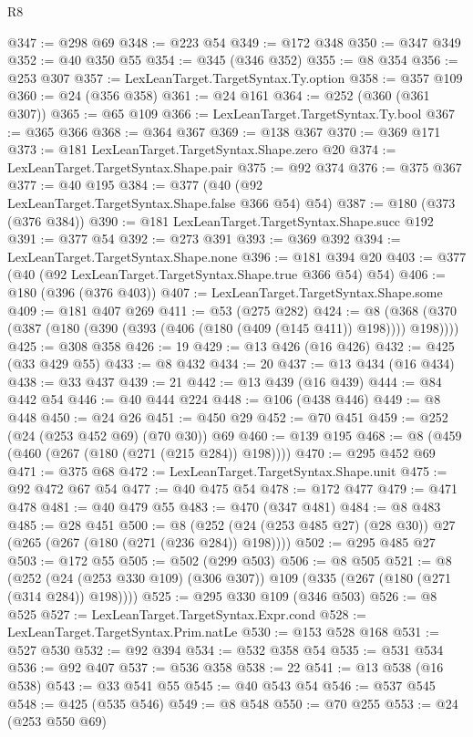 \begin{lexlean}{R8}
\begin{coremodule}
@347 := @298 @69
@348 := @223 @54
@349 := @172 @348
@350 := @347 @349
@352 := @40 @350 @55
@354 := @345 (@346 @352)
@355 := @8 @354
@356 := @253 @307
@357 := LexLeanTarget.TargetSyntax.Ty.option
@358 := @357 @109
@360 := @24 (@356 @358)
@361 := @24 @161
@364 := @252 (@360 (@361 @307))
@365 := @65 @109
@366 := LexLeanTarget.TargetSyntax.Ty.bool
@367 := @365 @366
@368 := @364 @367
@369 := @138 @367
@370 := @369 @171
@373 := @181 LexLeanTarget.TargetSyntax.Shape.zero @20
@374 := LexLeanTarget.TargetSyntax.Shape.pair
@375 := @92 @374
@376 := @375 @367
@377 := @40 @195
@384 := @377 (@40 (@92 LexLeanTarget.TargetSyntax.Shape.false @366 @54) @54)
@387 := @180 (@373 (@376 @384))
@390 := @181 LexLeanTarget.TargetSyntax.Shape.succ @192
@391 := @377 @54
@392 := @273 @391
@393 := @369 @392
@394 := LexLeanTarget.TargetSyntax.Shape.none
@396 := @181 @394 @20
@403 := @377 (@40 (@92 LexLeanTarget.TargetSyntax.Shape.true @366 @54) @54)
@406 := @180 (@396 (@376 @403))
@407 := LexLeanTarget.TargetSyntax.Shape.some
@409 := @181 @407 @269
@411 := @53 (@275 @282)
@424 := @8 (@368 (@370 (@387 (@180 (@390 (@393 (@406 (@180 (@409 (@145 @411)) @198)))) @198))))
@425 := @308 @358
@426 := 19
@429 := @13 @426 (@16 @426)
@432 := @425 (@33 @429 @55)
@433 := @8 @432
@434 := 20
@437 := @13 @434 (@16 @434)
@438 := @33 @437
@439 := 21
@442 := @13 @439 (@16 @439)
@444 := @84 @442 @54
@446 := @40 @444 @224
@448 := @106 (@438 @446)
@449 := @8 @448
@450 := @24 @26
@451 := @450 @29
@452 := @70 @451
@459 := @252 (@24 (@253 @452 @69) (@70 @30)) @69
@460 := @139 @195
@468 := @8 (@459 (@460 (@267 (@180 (@271 (@215 @284)) @198))))
@470 := @295 @452 @69
@471 := @375 @68
@472 := LexLeanTarget.TargetSyntax.Shape.unit
@475 := @92 @472 @67 @54
@477 := @40 @475 @54
@478 := @172 @477
@479 := @471 @478
@481 := @40 @479 @55
@483 := @470 (@347 @481)
@484 := @8 @483
@485 := @28 @451
@500 := @8 (@252 (@24 (@253 @485 @27) (@28 @30)) @27 (@265 (@267 (@180 (@271 (@236 @284)) @198))))
@502 := @295 @485 @27
@503 := @172 @55
@505 := @502 (@299 @503)
@506 := @8 @505
@521 := @8
    (@252 (@24 (@253 @330 @109) (@306 @307)) @109 (@335 (@267 (@180 (@271 (@314 @284)) @198))))
@525 := @295 @330 @109 (@346 @503)
@526 := @8 @525
@527 := LexLeanTarget.TargetSyntax.Expr.cond
@528 := LexLeanTarget.TargetSyntax.Prim.natLe
@530 := @153 @528 @168
@531 := @527 @530
@532 := @92 @394
@534 := @532 @358 @54
@535 := @531 @534
@536 := @92 @407
@537 := @536 @358
@538 := 22
@541 := @13 @538 (@16 @538)
@543 := @33 @541 @55
@545 := @40 @543 @54
@546 := @537 @545
@548 := @425 (@535 @546)
@549 := @8 @548
@550 := @70 @255
@553 := @24 (@253 @550 @69)

\end{coremodule}
\end{lexlean}
